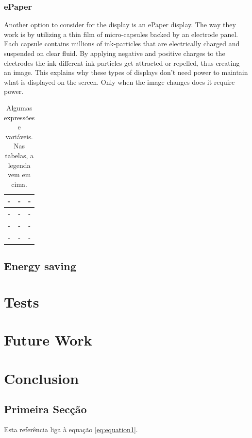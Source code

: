 \documentclass[english]{ist-thesis}
\begin{document}
\subsection{ePaper}
Another option to consider for the display is an ePaper display. 
The way they work is by utilizing a thin film of micro-capsules backed by an electrode panel. Each capsule contains millions of ink-particles that are electrically charged and suspended on clear fluid. By applying negative and positive charges to the electrodes the ink different ink particles get attracted or repelled, thus creating an image. This explains why these types of displays don't need power to maintain what is displayed on the screen. Only when the image changes does it require power. 

\begin{table}[ht]
	\centering                 
	\caption{Algumas expressões e variáveis. Nas tabelas, a legenda vem em cima.}
	\begin{tabular}{| c | c | c |}
            \hline
		- & - & - \\
		\hline
		- & - & - \\
		\hline
		- & - & - \\
		\hline
		- & - & - \\
		\hline
	\end{tabular}
	\label{tab:displays}
\end{table}

\section{Energy saving}

\chapter{Tests}

\chapter{Future Work}

\chapter{Conclusion}

\section{Primeira Secção}

Esta referência liga à equação \eqref{eq:equation1}.
\end{document}
